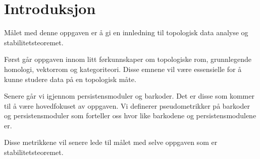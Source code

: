 \section{Introduksjon}
Målet med denne oppgaven er å gi en innledning til topologisk data analyse og stabilitetsteoremet.

Først går oppgaven innom litt førkunnskaper om topologiske rom, grunnlegende homologi, vektorrom og kategoriteori. Disse emnene vil være essensielle for å kunne studere data på en topologisk måte.

Senere går vi igjennom persistensmoduler og barkoder. Det er disse som kommer til å være hovedfokuset av oppgaven. Vi definerer pseudometrikker på barkoder og persistensmoduler som forteller oss hvor like barkodene og persistensmodulene er.

Disse metrikkene vil senere lede til målet med selve oppgaven som er stabilitetsteoremet.
